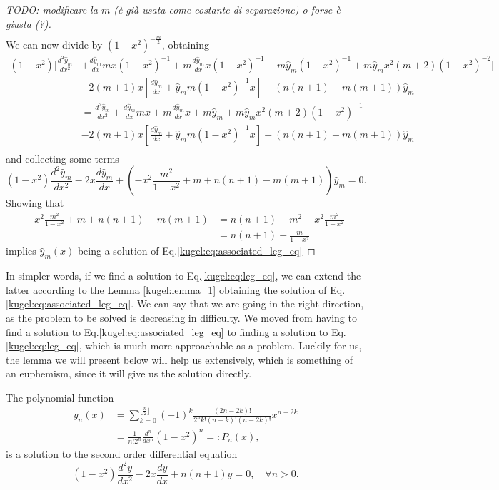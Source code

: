\begin{proof} [TODO: modificare la $m$ (è già usata come costante di separazione) o forse è giusta (?)]
\begin{align*}
    \end{align*}
    We can now divide by $(1-x^2)^{-\frac{m}{2}}$, obtaining
    \begin{align*}
    (1-x^2)\biggl[\frac{d^2\hat{y}_m}{dx^2} &+ \frac{d\hat{y}_m}{dx}mx (1-x^2)^{-1} + m\frac{d\hat{y}_m}{dx}x (1-x^2)^{-1} + m\hat{y}_m  (1-x^2)^{-1} + m\hat{y}_m x^2(m+2)(1-x^2)^{-2}\biggr] \\
    &-2(m+1)x\left[  \frac{d\hat{y}_m}{dx} + \hat{y}_mm(1-x^2)^{-1}x \right] + (n(n+1)-m(m+1))\hat{y}_m\\
    &= \frac{d^2\hat{y}_m}{dx^2} + \frac{d\hat{y}_m}{dx}mx + m\frac{d\hat{y}_m}{dx}x + m\hat{y}_m + m\hat{y}_m x^2(m+2)(1-x^2)^{-1} \\
    &-2(m+1)x\left[  \frac{d\hat{y}_m}{dx} + \hat{y}_mm(1-x^2)^{-1}x \right] + (n(n+1)-m(m+1))\hat{y}_m\\
    \end{align*}
    and collecting some terms
    \begin{equation*}
    (1-x^2)\frac{d^2\hat{y}_m}{dx^2} - 2x\frac{d\hat{y}_m}{dx} + \left( -x^2 \frac{m^2}{1-x^2} + m+n(n+1)-m(m+1)\right)\hat{y}_m=0.
    \end{equation*}
    Showing that 
    \begin{align*}
    -x^2 \frac{m^2}{1-x^2} + m+n(n+1)-m(m+1) &= n(n+1)- m^2 -x^2 \frac{m^2}{1-x^2} \\
    &= n(n+1)- \frac{m}{1-x^2}
    \end{align*}
    implies $\hat{y}_m(x)$ being a solution of Eq.\eqref{kugel:eq:associated_leg_eq}
\end{proof}
In simpler words, if we find a solution to Eq.\eqref{kugel:eq:leg_eq}, we can extend the latter according to the Lemma \ref{kugel:lemma_1} obtaining the solution of Eq.\eqref{kugel:eq:associated_leg_eq}.\newline
We can say that we are going in the right direction, as the problem to be solved is decreasing in difficulty. We moved from having to find a solution to Eq.\eqref{kugel:eq:associated_leg_eq} to finding a solution to Eq.\eqref{kugel:eq:leg_eq}, which is much more approachable as a problem. Luckily for us, the lemma we will present below will help us extensively, which is something of an euphemism, since it will give us the solution directly.
\begin{lemma}
    The polynomial function
    \begin{align*}
        y_n(x)&=\sum_{k=0}^{\lfloor \frac{n}{2} \rfloor} (-1)^k \frac{(2n-2k)!}{2^n k! (n-k)!(n-2k)!} x^{n-2k}\\
        &= \frac{1}{n!2^n}\frac{d^n}{dx^n}(1-x^2)^n =: P_n(x),
    \end{align*}
    is a solution to the second order differential equation
    \begin{equation}\label{kugel:eq:sol_leg}
        (1-x^2)\frac{d^2y}{dx^2}-2x\frac{dy}{dx} + n(n+1)y=0, \quad \forall n>0.
    \end{equation}
\end{lemma}
